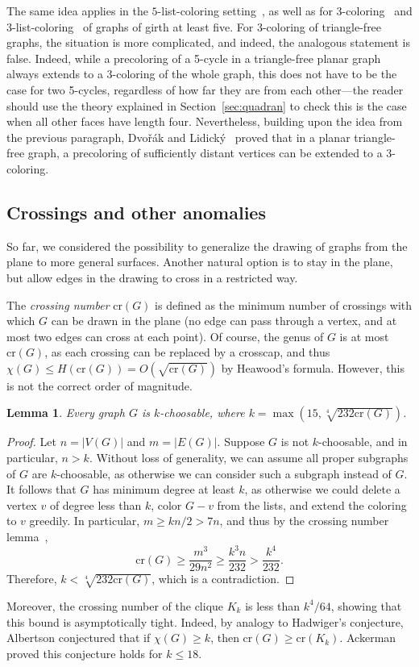 \documentclass[12pt,twoside,openright,a4paper]{book}
\newtheorem{lemma}[theorem]{Lemma}
\newcommand{\crs}{\text{cr}}
\begin{document}
The same idea applies in the $5$-list-coloring setting~\cite{lukethe}, as well as for 3-coloring~\cite{trfree3} and 3-list-coloring~\cite{postle3crit}
of graphs of girth at least five.  For 3-coloring of triangle-free graphs, the situation is more complicated, and indeed, the analogous statement
is false.  Indeed, while a precoloring of a 5-cycle in a triangle-free planar graph always extends to a 3-coloring of the whole
graph, this does not have to be the case for two 5-cycles, regardless of how far they are from each other---the reader should
use the theory explained in Section~\ref{sec:quadran} to check this is the case when all other faces have length four.
Nevertheless, building upon the idea from the previous paragraph, Dvo\v{r}\'ak and Lidick{\'y}~\cite{cylgen-part2} proved that
in a planar triangle-free graph, a precoloring of sufficiently distant vertices can be extended to a $3$-coloring.

\subsection{Crossings and other anomalies}

So far, we considered the possibility to generalize the drawing of graphs from the plane to more general surfaces.
Another natural option is to stay in the plane, but allow edges in the drawing to cross in a restricted way.

The \emph{crossing number} $\crs(G)$ is defined as the minimum number of crossings with which $G$ can be drawn in the plane
(no edge can pass through a vertex, and at most two edges can cross at each point).  Of course, the genus of $G$ is
at most $\crs(G)$, as each crossing can be replaced by a crosscap, and thus $\chi(G)\le H(\crs(G))=O(\sqrt{\crs(G)})$
by Heawood's formula.  However, this is not the correct order of magnitude.
\begin{lemma}
Every graph $G$ is $k$-choosable, where $k=\max(15,\sqrt[4]{232\crs(G)})$.
\end{lemma}
\begin{proof}
Let $n=|V(G)|$ and $m=|E(G)|$.  Suppose $G$ is not $k$-choosable, and in particular, $n>k$.
Without loss of generality, we can assume all proper subgraphs of $G$ are $k$-choosable,
as otherwise we can consider such a subgraph instead of $G$.  It follows that $G$ has minimum degree at least $k$,
as otherwise we could delete a vertex $v$ of degree less than $k$, color $G-v$ from the lists, and extend the coloring to $v$ greedily.
In particular, $m\ge kn/2>7n$, and thus by the crossing number lemma~\cite{ackerman2019topological},
$$\crs(G)\ge \frac{m^3}{29n^2}\ge\frac{k^3n}{232}>\frac{k^4}{232}.$$
Therefore, $k<\sqrt[4]{232\crs(G)}$, which is a contradiction.
\end{proof}
Moreover, the crossing number of the clique $K_k$ is less than $k^4/64$, showing that this bound is asymptotically tight.
Indeed, by analogy to Hadwiger's conjecture, Albertson conjectured that if $\chi(G)\ge k$, then $\crs(G)\ge \crs(K_k)$.
Ackerman~\cite{ackerman2019topological} proved this conjecture holds for $k\le 18$.
\end{document}
